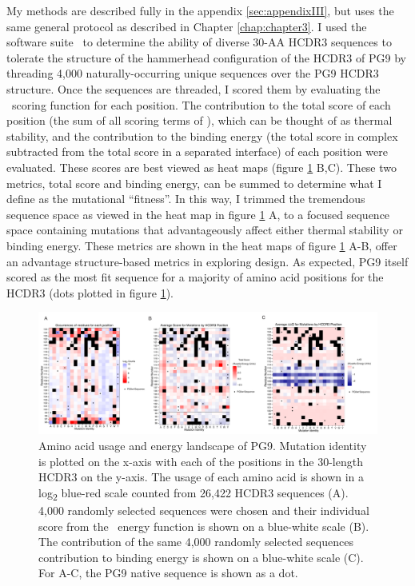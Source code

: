 My methods are described fully in the appendix \ref{sec:appendixIII}, but uses the same general protocol as described in Chapter \ref{chap:chapter3}. I used the software suite \rosetta~to determine the ability of diverse 30-AA HCDR3 sequences to tolerate the structure of the hammerhead configuration of the HCDR3 of PG9 by threading 4,000 naturally-occurring unique sequences over the PG9 HCDR3 structure. Once the sequences are threaded, I scored them by evaluating the \rosetta~scoring function for each position. The contribution to the total score of each position (the sum of all scoring terms of \rosetta), which can be thought of as thermal stability, and the contribution to the binding energy (the total score in complex subtracted from the total score in a separated interface) of each position were evaluated. These scores are best viewed as heat maps (figure \ref{fig:figure4_2} B,C). These two metrics, total score and binding energy, can be summed to determine what I define as the mutational ``fitness''. In this way, I trimmed the tremendous sequence space as viewed in the heat map in figure \ref{fig:figure4_2} A, to a focused sequence space containing mutations that advantageously affect either thermal stability or binding energy. These metrics are shown in the heat maps of figure \ref{fig:figure4_2} A-B, offer an advantage structure-based metrics in exploring design. As expected, PG9 itself scored as the most fit sequence for a majority of amino acid positions for the HCDR3 (dots plotted in figure \ref{fig:figure4_2}).

\begin{figure}
   \centering
   \includegraphics[width=.99\textwidth]{images/chapter4/figure4_2.pdf} %
   \caption[Amino Acid Usage and Energy Landscape of PG9]{Amino acid usage and energy landscape of PG9. Mutation identity is plotted on the x-axis with each of the positions in the 30-length HCDR3 on the y-axis. The usage of each amino acid is shown in a log\textsubscript{2} blue-red scale counted from 26,422 HCDR3 sequences (A). 4,000 randomly selected sequences were chosen and their individual score from the \rosetta~energy function is shown on a blue-white scale (B). The contribution of the same 4,000 randomly selected sequences contribution to binding energy is shown on a blue-white scale (C). For A-C, the PG9 native sequence is shown as a dot.
}
   \label{fig:figure4_2}
\end{figure}

